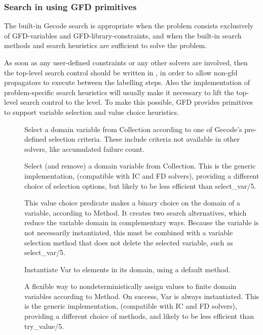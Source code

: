 \subsubsection{Search in {\eclipse} using GFD primitives}
\label{searchgfd}
The built-in Gecode search is appropriate when the problem consists
exclusively of GFD-variables and GFD-library-constraints, and when the
built-in search methods and search heuristics are sufficient to solve
the problem.

As soon as any user-defined constraints or any other {\eclipse}
solvers are involved, then the top-level search control should be
written in \eclipse, in order to allow non-gfd propagators to execute
between the labelling steps.  Also the implementation of problem-specific
search heuristics will usually make it necessary to lift the top-level
search control to the {\eclipse} level.
To make this possible, GFD provides primitives to support variable 
selection and value choice heuristics.

\begin{description}
\item[]
Select a domain variable from Collection according to one of Gecode's
pre-defined selection criteria.  These include criteria not available in
other {\eclipse} solvers, like accumulated failure count.

\item[]
Select (and remove) a domain variable from Collection.  This is the
generic implementation, (compatible with IC and FD solvers), providing
a different choice of selection options, but likely to be less
efficient than select_var/5.

\item[]
This value choice predicate makes a binary choice on the domain of a variable,
according to Method.
It creates two search alternatives, which reduce the variable domain
in complementary ways.  Because the variable is not necessarily instantiated,
this must be combined with a variable selection method that does not delete
the selected variable, such as select_var/5.

\item[]
Instantiate Var to elements in its domain, using a default method.

\item[]
A flexible way to nondeterministically assign values to finite domain
variables according to Method.  On success, Var is always instantiated.
This is the generic implementation,
(compatible with IC and FD solvers), providing a different choice of methods,
and likely to be less efficient than try_value/5.
\end{description}

